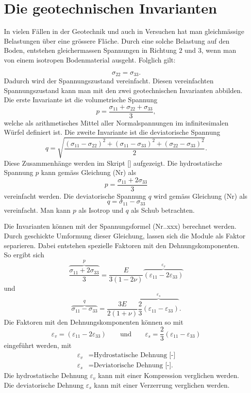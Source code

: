 \section{Die geotechnischen Invarianten\label{spannung:section:Die geotechnischen Invarianten}}
In vielen Fällen in der Geotechnik und auch in Versuchen hat man gleichmässige Belastungen über eine grössere Fläche.
Durch eine solche Belastung auf den Boden, entstehen gleichermassen Spannungen in Richtung $2$ und $3$,
wenn man von einem isotropen Bodenmaterial ausgeht.
Folglich gilt:

\[
\sigma_{22}
=
\sigma_{33}
.
\]
Dadurch wird der Spannungszustand vereinfacht.
Diesen vereinfachten Spannungszustand kann man mit den zwei geotechnischen Invarianten abbilden.
Die erste Invariante ist die volumetrische Spannung
\[
p
=
\frac{\sigma_{11}+\sigma_{22}+\sigma_{33}}{3}
,
\]
welche als arithmetisches Mittel aller Normalspannungen im infinitesimalen Würfel definiert ist.
Die zweite Invariante ist die deviatorische Spannung
\[
q
=
\sqrt{\frac{(\sigma_{11}-\sigma_{22})^{2}+(\sigma_{11}-\sigma_{33})^{2}+(\sigma_{22}-\sigma_{33})^{2}}{2}}
.
\]
Diese Zusammenhänge werden im Skript [\cite{spannung:Stoffgesetze und numerische Modellierung in der Geotechnik}] aufgezeigt.
Die hydrostatische Spannung $p$ kann gemäss Gleichung (Nr) als
\[
p
=
\frac{\sigma_{11}+2\sigma_{33}}{3}
\]
vereinfacht werden.
Die deviatorische Spannung $q$ wird gemäss Gleichung (Nr) als
\[
q
=
\sigma_{11}-\sigma_{33}
\]
vereinfacht. Man kann $p$ als Isotrop und $q$ als Schub betrachten.

Die Invarianten können mit der Spannungsformel (Nr..xxx) berechnet werden.
Durch geschickte Umformung dieser Gleichung, lassen sich die Module als Faktor separieren.
Dabei entstehen spezielle Faktoren mit den Dehnungskomponenten.
So ergibt sich
\[
\overbrace{\frac{\sigma_{11}+2\sigma_{33}}{3}}^{p}
=
\frac{E}{3(1-2\nu)} \overbrace{(\varepsilon_{11} - 2\varepsilon_{33})}^{\varepsilon_{v}}
\]
und
\[
\overbrace{\sigma_{11}-\sigma_{33}}^{q}
=
\frac{3E}{2(1+\nu)} \overbrace{\frac{2}{3}(\varepsilon_{11} - \varepsilon_{33})}^{\varepsilon_{s}}
.
\]
Die Faktoren mit den Dehnungskomponenten können so mit
\[
\varepsilon_{v}
=
(\varepsilon_{11} - 2\varepsilon_{33})
\qquad
\text{und}
\qquad
\varepsilon_{s}
=
\frac{2}{3}(\varepsilon_{11} - \varepsilon_{33})
\]
eingeführt werden, mit
\begin{align*}
	\varepsilon_{v} &= \text{Hydrostatische Dehnung [-]} \\
	\varepsilon_{s} &= \text{Deviatorische Dehnung [-].}
\end{align*}
Die hydrostatische Dehnung $\varepsilon_{v}$ kann mit einer Kompression verglichen werden.
Die deviatorische Dehnung $\varepsilon_{s}$  kann mit einer Verzerrung verglichen werden.

